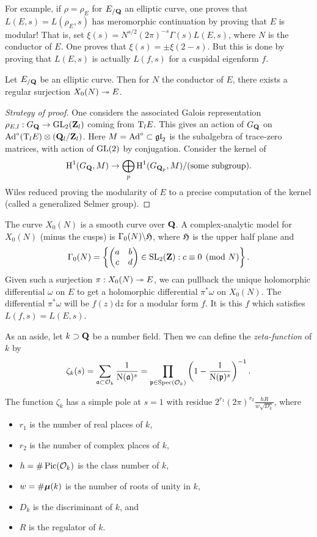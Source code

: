 For example, if $\rho=\rho_E$ for $E_{/\mathbf{Q}}$ an elliptic curve, one proves that 
$L(E,s)=L(\rho_E,s)$ has meromorphic continuation by proving that $E$ is 
modular! That is, set $\xi(s)=N^{s/2} (2\pi)^{-s} \Gamma(s) L(E,s)$, where $N$ 
is the conductor of $E$. One proves that $\xi(s)=\pm \xi(2-s)$. But this is 
done by proving that $L(E,s)$ is actually $L(f,s)$ for a cuspidal eigenform 
$f$. 

\begin{theorem}
Let $E_{/\mathbf{Q}}$ be an elliptic curve. Then for $N$ the conductor of $E$, there 
exists a regular surjection $X_0(N)\twoheadrightarrow E$. 
\end{theorem}
\begin{proof}[Strategy of proof]
One considers the associated Galois representation 
$\rho_{E,l}:G_{\mathbf{Q}}\to \operatorname{GL}_2(\mathbf{Z}_l)$ coming from $\mathrm{T}_l E$. This gives an 
action of $G_{\mathbf{Q}}$ on $\operatorname{Ad}^\circ(\mathrm{T}_l E)\otimes (\mathbf{Q}_l/\mathbf{Z}_l)$. Here 
$M=\operatorname{Ad}^\circ\subset \mathfrak{gl}_2$ is the subalgebra of trace-zero 
matrices, with action of $\operatorname{GL}(2)$ by conjugation. Consider the kernel of 
\[
  \operatorname{H}^1(G_{\mathbf{Q}},M) \to \bigoplus_p \operatorname{H}^1(G_{\mathbf{Q}_p},M) / \text{(some subgroup)} .
\]
Wiles reduced proving the modularity of $E$ to a precise computation of 
the kernel (called a generalized Selmer group). 
\end{proof}

The curve $X_0(N)$ is a smooth curve over $\mathbf{Q}$. A complex-analytic model for 
$X_0(N)$ (minus the cusps) is $\Gamma_0(N)\backslash \mathfrak{H}$, where $\mathfrak{H}$ is 
the upper half plane and 
\[
  \Gamma_0(N)=\left\{\begin{pmatrix} a & b \\ c & d\end{pmatrix}\in \operatorname{SL}_2(\mathbf{Z}):c\equiv 0\pmod N\right\} .
\]
Given such a surjection $\pi:X_0(N)\twoheadrightarrow E$, we can pullback the unique 
holomorphic differential $\omega$ on $E$ to get a holomorphic differential 
$\pi^\ast\omega$ on $X_0(N)$. The differential $\pi^\ast\omega$ will be 
$f(z)\mathrm{d} z$ for a modular form $f$. It is this $f$ which satisfies 
$L(f,s) = L(E,s)$. 

As an aside, let $k\supset \mathbf{Q}$ be a number field. Then we can define the 
\emph{zeta-function} of $k$ by 
\[
  \zeta_k(s) = \sum_{\mathfrak{a}\subset \mathcal{O}_k} \frac{1}{\operatorname{N}(\mathfrak{a})^s} = \prod_{\mathfrak{p}\in\operatorname{Spec}(\mathcal{O}_k)} \left(1-\frac{1}{\operatorname{N}(\mathfrak{p})^s}\right)^{-1} .
\]
\begin{theorem}
The function $\zeta_k$ has a simple pole at $s=1$ with residue 
$2^{r_1} (2\pi)^{r_2} \frac{h R}{w\sqrt{D_k}}$, where 
\begin{itemize}
\item $r_1$ is the number of real places of $k$, 
\item $r_2$ is the number of complex places of $k$, 
\item $h=\# \operatorname{Pic}(\mathcal{O}_k)$ is the class number of $k$, 
\item $w=\# {\bm\mu}(k)$ is the number of roots of unity in $k$, 
\item $D_k$ is the discriminant of $k$, and 
\item $R$ is the regulator of $k$. 
\end{itemize}
\end{theorem}

